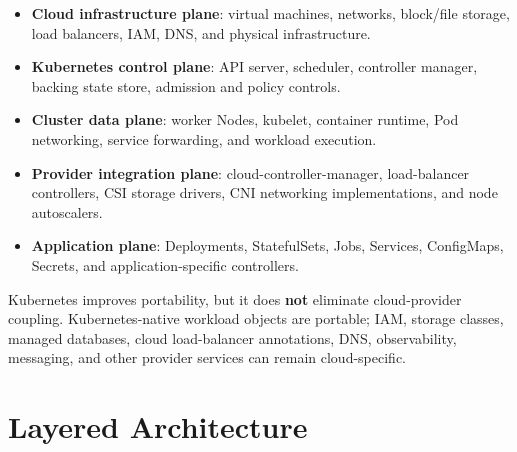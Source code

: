 \documentclass[11pt]{article}
\begin{document}
\begin{itemize}
  \item \textbf{Cloud infrastructure plane}: virtual machines, networks, block/file storage, load balancers, IAM, DNS, and physical infrastructure.
  \item \textbf{Kubernetes control plane}: API server, scheduler, controller manager, backing state store, admission and policy controls.
  \item \textbf{Cluster data plane}: worker Nodes, kubelet, container runtime, Pod networking, service forwarding, and workload execution.
  \item \textbf{Provider integration plane}: cloud-controller-manager, load-balancer controllers, CSI storage drivers, CNI networking implementations, and node autoscalers.
  \item \textbf{Application plane}: Deployments, StatefulSets, Jobs, Services, ConfigMaps, Secrets, and application-specific controllers.
\end{itemize}

\begin{warningbox}
Kubernetes improves portability, but it does \textbf{not} eliminate cloud-provider coupling. Kubernetes-native workload objects are portable; IAM, storage classes, managed databases, cloud load-balancer annotations, DNS, observability, messaging, and other provider services can remain cloud-specific.
\end{warningbox}

\section{Layered Architecture}
\end{document}
